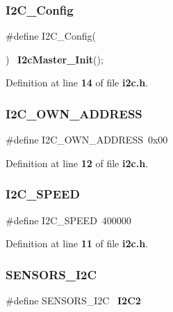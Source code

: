 \subsubsection{I2\+C\+\_\+\+Config}
{\footnotesize\ttfamily \#define I2\+C\+\_\+\+Config(\begin{DoxyParamCaption}{ }\end{DoxyParamCaption})~\textbf{ I2c\+Master\+\_\+\+Init}();}



Definition at line \textbf{ 14} of file \textbf{ i2c.\+h}.

\mbox{\label{i2c_8h_ab665b5b80f13670806350a6b460dad71}} 
\subsubsection{I2\+C\+\_\+\+O\+W\+N\+\_\+\+A\+D\+D\+R\+E\+SS}
{\footnotesize\ttfamily \#define I2\+C\+\_\+\+O\+W\+N\+\_\+\+A\+D\+D\+R\+E\+SS~0x00}



Definition at line \textbf{ 12} of file \textbf{ i2c.\+h}.

\mbox{\label{i2c_8h_a410dc1e7572425a449b5dc0f7ca9f69d}} 
\subsubsection{I2\+C\+\_\+\+S\+P\+E\+ED}
{\footnotesize\ttfamily \#define I2\+C\+\_\+\+S\+P\+E\+ED~400000}



Definition at line \textbf{ 11} of file \textbf{ i2c.\+h}.

\mbox{\label{i2c_8h_a8d4efa0b59643bca3dc9c486c0123060}} 
\subsubsection{S\+E\+N\+S\+O\+R\+S\+\_\+\+I2C}
{\footnotesize\ttfamily \#define S\+E\+N\+S\+O\+R\+S\+\_\+\+I2C~\textbf{ I2\+C2}}



